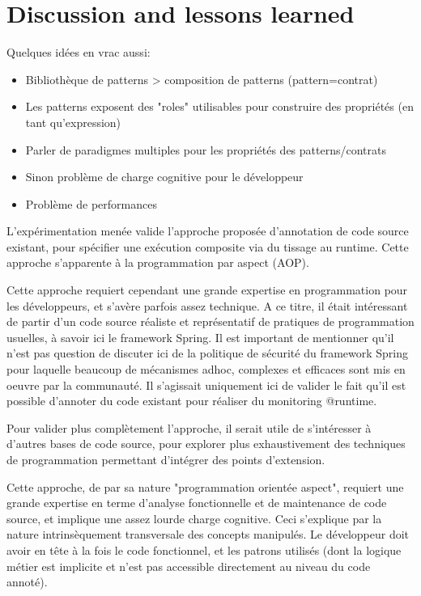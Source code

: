 \section{Discussion and lessons learned}
\label{sec:discussion-lessons-learned}


Quelques idées en vrac aussi:

\begin{itemize}
    \item Bibliothèque de patterns > composition de patterns (pattern=contrat)
    \item Les patterns exposent des "roles" utilisables pour construire des propriétés (en tant qu'expression)
    \item Parler de paradigmes multiples pour les propriétés des patterns/contrats
    \item Sinon problème de charge cognitive pour le développeur
    \item Problème de performances
\end{itemize}

L'expérimentation menée valide l'approche proposée d'annotation de code source existant, pour spécifier une exécution composite via du tissage au runtime. Cette approche s'apparente à la programmation par aspect (AOP).

Cette approche requiert cependant une grande expertise en programmation pour les développeurs, et s'avère parfois assez technique. A ce titre, il était intéressant de partir d'un code source réaliste et représentatif de pratiques de programmation usuelles, à savoir ici le framework Spring. Il est important de mentionner qu'il n'est pas question de discuter ici de la politique de sécurité du framework Spring pour laquelle beaucoup de mécanismes adhoc, complexes et efficaces sont mis en oeuvre par la communauté. Il s'agissait uniquement ici de valider le fait qu'il est possible d'annoter du code existant pour réaliser du monitoring @runtime.

Pour valider plus complètement l'approche, il serait utile de s'intéresser à d'autres bases de code source, pour explorer plus exhaustivement des techniques de programmation permettant d'intégrer des points d'extension. 

Cette approche, de par sa nature "programmation orientée aspect", requiert une grande expertise en terme d'analyse fonctionnelle et de maintenance de code source, et implique une assez lourde charge cognitive. Ceci s'explique par la nature intrinsèquement transversale des concepts manipulés. Le développeur doit avoir en tête à la fois le code fonctionnel, et les patrons utilisés (dont la logique métier est implicite et n'est pas accessible directement au niveau du code annoté).

